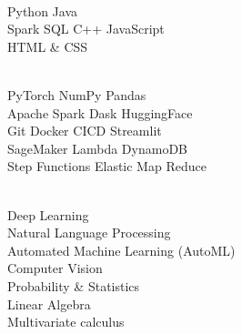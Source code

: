 \documentclass[]{deedy-resume-openfont}
\begin{document}
\begin{minipage}[t]{.315\textwidth}
     \\
    Python 
    \enspace \textbullet \enspace 
    Java 
    \subsectionsep
    \\
    Spark SQL
    \enspace \textbullet \enspace 
    C++
    \enspace \textbullet \enspace 
    JavaScript \\  
    HTML \& CSS \\
\end{minipage} \hfill 
\begin{minipage}[t]{.335\textwidth}
    \\
    PyTorch 
    \enspace \textbullet \enspace 
    NumPy
    \enspace \textbullet \enspace 
    Pandas \\
    Apache Spark
    \enspace \textbullet \enspace 
    Dask
    \enspace \textbullet \enspace  
    HuggingFace
    \subsectionsep
    \\
    Git
    \enspace \textbullet \enspace 
    Docker 
    \enspace \textbullet \enspace 
    CICD 
    \enspace \textbullet \enspace 
    Streamlit
    \subsectionsep
    \\
    SageMaker
    \enspace \textbullet \enspace 
    Lambda 
    \enspace \textbullet \enspace 
    DynamoDB \\
    Step Functions
    \enspace \textbullet \enspace 
    Elastic Map Reduce \\  
\end{minipage} \hfill 
\begin{minipage}[t]{.325\textwidth}
    \\
    Deep Learning \\
    Natural Language Processing \\
    Automated Machine Learning (AutoML) \\
    Computer Vision
    \subsectionsep
    \\
    Probability \& Statistics \\
    Linear Algebra \\
    Multivariate calculus \\
\end{minipage}
\end{document}
